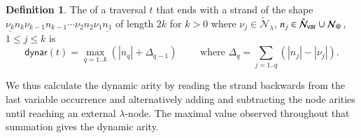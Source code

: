 \documentclass{elsarticle}
\makeatletter
\newif\iflongversion
\theoremstyle{plain}
\theoremstyle{definition}
\newtheorem{definition}{Definition}[section]
\newcommand\Nodes{\mathcal{N}}%
\newcommand\NodesApp{\Nodes_@}%
\newcommand\ExtendedNodesVar{\tilde{\Nodes}_{\sf var}}
\newcommand\ExtendedNodesLmd{\tilde{\Nodes}_{\lambda}}
\newcommand\dynar{\textsf{dynar}} %
\makeatother
\begin{document}
\begin{definition} %
\label{dfn:dynamic-arity}
The  of a traversal $t$ that ends with a strand
 of the shape $\underline{\nu_k} n_k \nu_{k-1} n_{k-1}\cdots \nu_2 n_2 \nu_1 \underline{n_1}$ of length $2k$ for $k>0$ where $\nu_j \in \ExtendedNodesLmd$, $n_j \in \ExtendedNodesVar\union\NodesApp$, $1\leq j\leq k$ is
$$
\dynar(t)
  = \max_{q=1..k} \left( |n_q| + \Delta_{q-1} \right)
  \qquad
  \mbox{ where }
  \Delta_q = \sum_{j=1..q} (|n_j|-|\nu_j|).
$$
\end{definition}

\iflongversion
We also have
$\dynar(t) = \max_{q=1..k} \left( |\nu_q| + \Delta_{q} \right)$.
Equivalently, it is given by the maximal value in the sequence $b_1 = |n_1|$, $b_{q+1} = b_q + |n_{q+1}|-|\nu_q|$ for $1 \leq q \leq k-1$.
\fi
We thus calculate the dynamic arity by reading the strand backwards from the last variable occurrence and alternatively adding and subtracting the node arities until reaching an external $\lambda$-node. The maximal value observed throughout that summation gives the dynamic arity.
\end{document}
